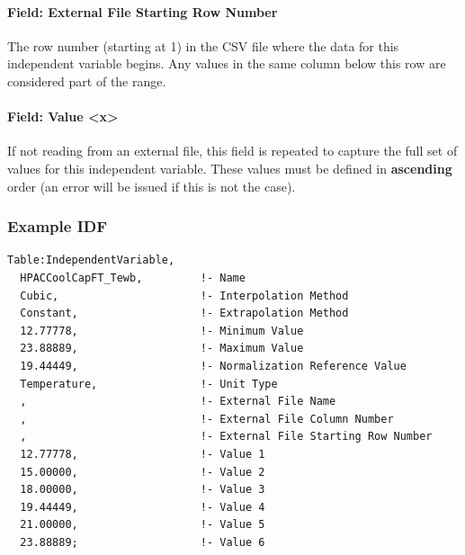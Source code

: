 \paragraph{Field: External File Starting Row
Number}\label{field-external-file-starting-row-number-1}

The row number (starting at 1) in the CSV file where the data for this
independent variable begins. Any values in the same column below this
row are considered part of the range.

\paragraph{Field: Value
\textless{}x\textgreater{}}\label{field-value-x}

If not reading from an external file, this field is repeated to capture
the full set of values for this independent variable. These values must
be defined in \textbf{ascending} order (an error will be issued if this
is not the case).

\subsubsection{Example IDF}\label{example-idf-2}

\begin{lstlisting}
Table:IndependentVariable,
  HPACCoolCapFT_Tewb,         !- Name
  Cubic,                      !- Interpolation Method
  Constant,                   !- Extrapolation Method
  12.77778,                   !- Minimum Value
  23.88889,                   !- Maximum Value
  19.44449,                   !- Normalization Reference Value
  Temperature,                !- Unit Type
  ,                           !- External File Name
  ,                           !- External File Column Number
  ,                           !- External File Starting Row Number
  12.77778,                   !- Value 1
  15.00000,                   !- Value 2
  18.00000,                   !- Value 3
  19.44449,                   !- Value 4
  21.00000,                   !- Value 5
  23.88889;                   !- Value 6
\end{lstlisting}
